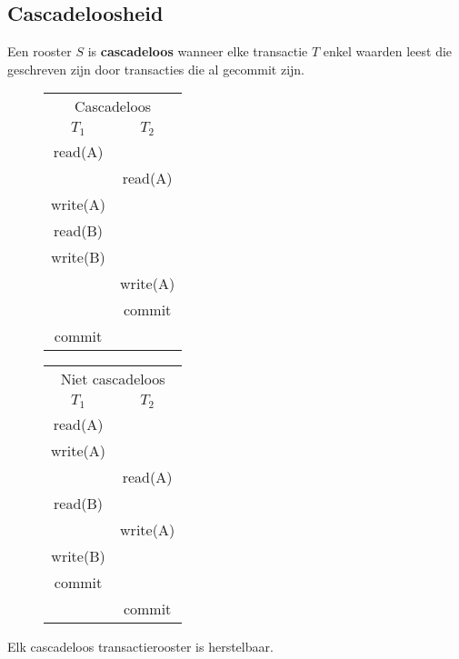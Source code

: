 \documentclass[transacties.tex]{subfiles}
\begin{document}
\subsection{Cascadeloosheid}
\begin{de}
Een rooster $S$ is \textbf{cascadeloos} wanneer elke transactie $T$ enkel waarden leest die geschreven zijn door transacties die al gecommit zijn.
\end{de}
\begin{figure}[H]
\centering
\begin{tabular}{c|c}
\multicolumn{2}{c}{Cascadeloos}\\
$T_1$&$T_2$\\
\hline
read(A) &\\
& read(A)\\
write(A)&\\
read(B)&\\
write(B)&\\
&write(A)\\
&commit\\
commit&
\end{tabular}
\begin{tabular}{c|c}
\multicolumn{2}{c}{Niet cascadeloos}\\
$T_1$&$T_2$\\
\hline
read(A) &\\
write(A)&\\
& read(A)\\
read(B)&\\
&write(A)\\
write(B)&\\
commit&\\
&commit\\
\end{tabular}
\end{figure}
\begin{ei}
Elk cascadeloos transactierooster is herstelbaar.
\end{ei}
\end{document}
